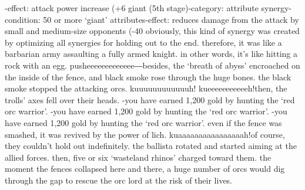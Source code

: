 -effect: attack power increase (+6%
giant (5th stage)-category: attribute synergy-condition: 50 or more ‘giant’ attributes-effect: reduces damage from the attack by small and medium-size opponents (-40%
obviously, this kind of synergy was created by optimizing all synergies for holding out to the end.
therefore, it was like a barbarian army assaulting a fully armed knight.
 in other words, it’s like hitting a rock with an egg.
pusheeeeeeeeeeeee―besides, the ‘breath of abyss’ encroached on the inside of the fence, and black smoke rose through the huge bones.
 the black smoke stopped the attacking orcs.
kuuuuuuuuuuuuh! kueeeeeeeeeeeh!then, the trolls’ axes fell over their heads.
-you have earned 1,200 gold by hunting the ‘red orc warrior’.
-you have earned 1,200 gold by hunting the ‘red orc warrior’.
-you have earned 1,200 gold by hunting the ‘red orc warrior’.
even if the fence was smashed, it was revived by the power of lich.
 kuaaaaaaaaaaaaaaaah!of course, they couldn’t hold out indefinitely.
 the ballista rotated and started aiming at the allied forces.
 then, five or six ‘wasteland rhinos’ charged toward them.
the moment the fences collapsed here and there, a huge number of orcs would dig through the gap to rescue the orc lord at the risk of their lives.

